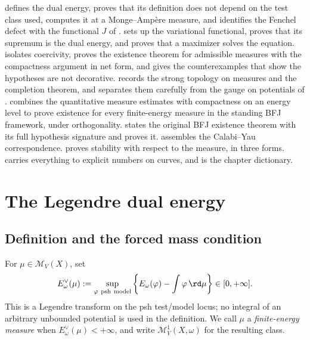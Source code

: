  defines the dual energy, proves that its
definition does not depend on the test class used, computes it at a
Monge--Amp\`ere measure, and identifies the Fenchel defect with the
functional $J$ of .
 sets up the variational functional, proves that
its supremum is the dual energy, and proves that a maximizer solves the
equation.   isolates coercivity, proves the
existence theorem for admissible measures with the compactness argument in
net form, and gives the counterexamples that show the hypotheses are not
decorative.   records the strong topology on
measures and the completion theorem, and separates them carefully from the
gauge on potentials of .
 combines the quantitative
measure estimates with compactness on an energy level to prove existence
for every finite-energy measure in the standing BFJ framework, under
orthogonality.
 states the original BFJ existence theorem with
its full hypothesis signature and proves it.  
assembles the Calabi--Yau correspondence.   proves
stability with respect to the measure, in three forms.
 carries everything to explicit numbers on curves, and
 is the chapter dictionary.

\section{The Legendre dual energy}
\label{sec:ch28-dual-energy}

\subsection{Definition and the forced mass condition}
\label{sec:ch28-dual-def}

\begin{definition}
\label{def:dual-energy-measure}
For $\mu\in\mathcal M_V(X)$, set
\begin{equation}
\label{eq:dual-energy-measure}
 E_\omega^\vee(\mu)
 :=\sup_{\varphi\ \mathrm{psh\ model}}
       \left\{E_\omega(\varphi)-\int\varphi\,\rd \mu\right\}
 \in[0,+\infty].
\end{equation}
This is a Legendre transform on the psh test/model locus; no integral of an
arbitrary unbounded potential is used in the definition.  We call $\mu$ a
\emph{finite-energy measure} when
$E_\omega^\vee(\mu)<+\infty$, and write
$\mathcal M^1_V(X,\omega)$ for the resulting class.
\end{definition}

